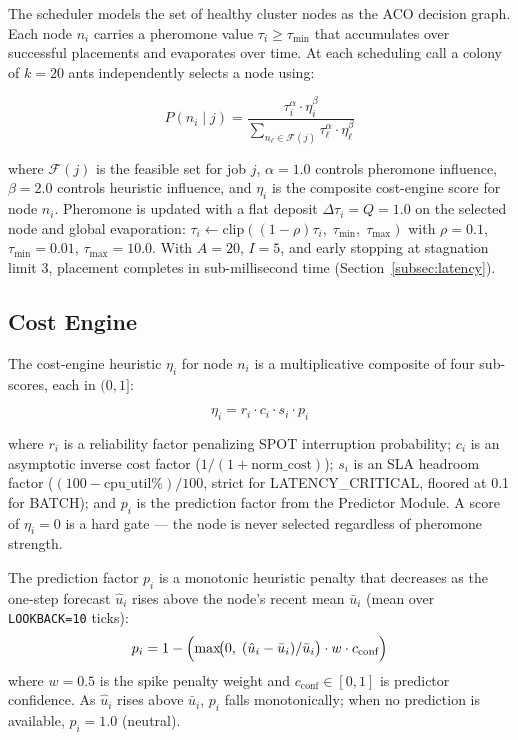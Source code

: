 \documentclass[conference]{IEEEtran}
\begin{document}
The scheduler models the set of healthy cluster nodes as the ACO decision
graph. Each node $n_i$ carries a pheromone value $\tau_i \geq \tau_{\min}$
that accumulates over successful placements and evaporates over time.
At each scheduling call a colony of $k{=}20$ ants independently selects a
node using:

\begin{equation}
  P(n_i \mid j) = \frac{\tau_i^{\alpha} \cdot \eta_i^{\beta}}
                       {\sum_{n_\ell \in \mathcal{F}(j)}
                        \tau_\ell^{\alpha} \cdot \eta_\ell^{\beta}}
  \label{eq:aco}
\end{equation}

where $\mathcal{F}(j)$ is the feasible set for job $j$,
$\alpha{=}1.0$ controls pheromone influence, $\beta{=}2.0$ controls
heuristic influence, and $\eta_i$ is the composite cost-engine score for
node $n_i$. Pheromone is updated with a flat deposit
$\Delta\tau_i = Q = 1.0$ on the selected node and global evaporation:
$\tau_i \leftarrow \text{clip}((1{-}\rho)\tau_i,\;\tau_{\min},\;\tau_{\max})$
with $\rho{=}0.1$, $\tau_{\min}{=}0.01$, $\tau_{\max}{=}10.0$.
With $A{=}20$, $I{=}5$, and early stopping at stagnation limit 3,
placement completes in sub-millisecond time
(Section~\ref{subsec:latency}).

\subsection{Cost Engine}

The cost-engine heuristic $\eta_i$ for node $n_i$ is a multiplicative
composite of four sub-scores, each in $(0,1]$:

\begin{equation}
  \eta_i = r_i \cdot c_i \cdot s_i \cdot p_i
  \label{eq:cost}
\end{equation}

where $r_i$ is a reliability factor penalizing SPOT interruption
probability; $c_i$ is an asymptotic inverse cost factor
($1 / (1 + \text{norm\_cost})$); $s_i$ is an SLA headroom factor
($(100 - \text{cpu\_util\%})/100$, strict for LATENCY\_CRITICAL, floored
at 0.1 for BATCH); and $p_i$ is the prediction factor from the Predictor
Module. A score of $\eta_i = 0$ is a hard gate --- the node is never
selected regardless of pheromone strength.

The prediction factor $p_i$ is a monotonic heuristic penalty that
decreases as the one-step forecast $\hat{u}_i$ rises above the node's
recent mean $\bar{u}_i$ (mean over \texttt{LOOKBACK=10} ticks):
\begin{equation}
  p_i = 1 - \Bigl(\max\!\bigl(0,\;(\hat{u}_i - \bar{u}_i)/\bar{u}_i\bigr)
               \cdot w \cdot c_{\text{conf}}\Bigr)
  \label{eq:pi}
\end{equation}
where $w{=}0.5$ is the spike penalty weight and $c_{\text{conf}} \in [0,1]$
is predictor confidence. As $\hat{u}_i$ rises above $\bar{u}_i$, $p_i$
falls monotonically; when no prediction is available, $p_i = 1.0$
(neutral).
\end{document}

